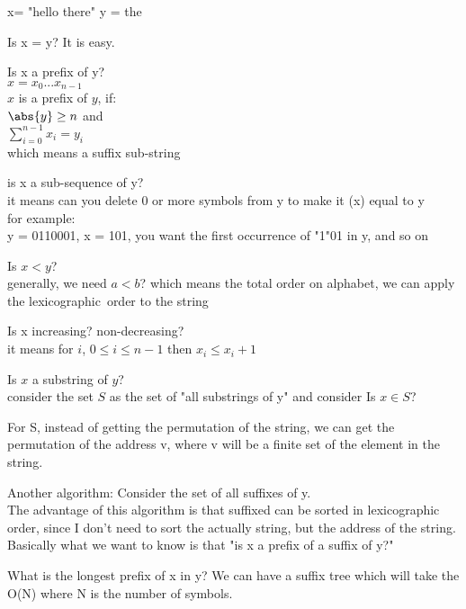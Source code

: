 \begin{exmp} x= "hello there" y = the
    
    Is x = y?
    It is easy.
    
    Is x a prefix of y?\\
    $x = x_0 ... x_{n-1}$\\
    $x$ is a prefix of $y$, if:\\
    $\abs{y} \geq n$ and\\
    $\sum_{i = 0}^{n-1} x_i = y_i$\\
    which means a suffix sub-string
    
    is x a sub-sequence of y? \\
    it means can you delete 0 or more symbols from y to make it (x) equal to y\\
    for example:\\
    y = 0110001, x = 101, you want the first occurrence of "1"01 in y, and so on
    
    Is $x < y$? \\
    generally, we need $a < b$? which means the total order on alphabet, we can apply the lexicographic\ order to the string
    
    Is x increasing? non-decreasing?\\
    it means for $i$, $0 \leq i \leq n-1$ then $x_i \leq x_i+1$

    
\end{exmp}



    Is $x$ a substring of $y$?\\
    consider the set $S$ as the set of "all substrings of y"
    and consider Is $x \in S$?

    For S, instead of getting the permutation of the string, we can get the permutation of the address v, where v will be a finite set of the element in the string.

    Another algorithm:
    Consider the set of all suffixes of y.\\
    The advantage of this algorithm is that suffixed can be sorted in lexicographic order, since I don't need to sort the actually string, but the address of the string.\\
    Basically what we want to know is that "is x a prefix of a suffix of y?"

    What is the longest prefix of x in y? We can have a suffix tree which will take the O(N) where N is the number of symbols.

